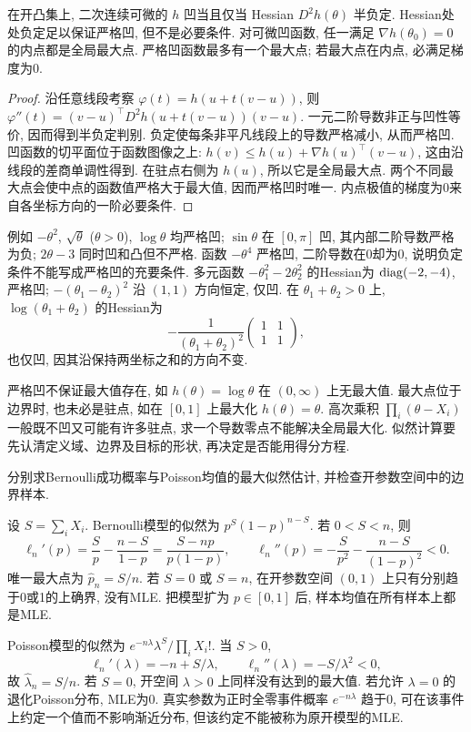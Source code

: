 \begin{proposition}[导数判别与极值]
在开凸集上, 二次连续可微的 $h$ 凹当且仅当 Hessian $D^2h(\theta)$ 半负定. Hessian处处负定足以保证严格凹, 但不是必要条件. 对可微凹函数, 任一满足 $\nabla h(\theta_0)=0$ 的内点都是全局最大点. 严格凹函数最多有一个最大点; 若最大点在内点, 必满足梯度为0.
\end{proposition}
\begin{proof}
沿任意线段考察 $\varphi(t)=h(u+t(v-u))$, 则 $\varphi''(t)=(v-u)^\top D^2h(u+t(v-u))(v-u)$. 一元二阶导数非正与凹性等价, 因而得到半负定判别. 负定使每条非平凡线段上的导数严格减小, 从而严格凹. 凹函数的切平面位于函数图像之上:
$h(v)\le h(u)+\nabla h(u)^\top(v-u)$, 这由沿线段的差商单调性得到. 在驻点右侧为 $h(u)$, 所以它是全局最大点. 两个不同最大点会使中点的函数值严格大于最大值, 因而严格凹时唯一. 内点极值的梯度为0来自各坐标方向的一阶必要条件.
\end{proof}
例如 $-\theta^2$, $\sqrt\theta$ ($\theta>0$), $\log\theta$ 均严格凹; $\sin\theta$ 在 $[0,\pi]$ 凹, 其内部二阶导数严格为负; $2\theta-3$ 同时凹和凸但不严格. 函数 $-\theta^4$ 严格凹, 二阶导数在0却为0, 说明负定条件不能写成严格凹的充要条件. 多元函数 $-\theta_1^2-2\theta_2^2$ 的Hessian为 $\operatorname{diag}(-2,-4)$, 严格凹; $-(\theta_1-\theta_2)^2$ 沿 $(1,1)$ 方向恒定, 仅凹. 在 $\theta_1+\theta_2>0$ 上, $\log(\theta_1+\theta_2)$ 的Hessian为
\[
 -\frac{1}{(\theta_1+\theta_2)^2}\begin{pmatrix}1&1\\1&1\end{pmatrix},
\]
也仅凹, 因其沿保持两坐标之和的方向不变.

严格凹不保证最大值存在, 如 $h(\theta)=\log\theta$ 在 $(0,\infty)$ 上无最大值. 最大点位于边界时, 也未必是驻点, 如在 $[0,1]$ 上最大化 $h(\theta)=\theta$. 高次乘积 $\prod_i(\theta-X_i)$ 一般既不凹又可能有许多驻点, 求一个导数零点不能解决全局最大化. 似然计算要先认清定义域、边界及目标的形状, 再决定是否能用得分方程.

\begin{example}
分别求Bernoulli成功概率与Poisson均值的最大似然估计, 并检查开参数空间中的边界样本.
\end{example}
\begin{solution}
设 $S=\sum_iX_i$. Bernoulli模型的似然为 $p^S(1-p)^{n-S}$. 若 $0<S<n$, 则
\[
 \ell_n'(p)=\frac Sp-\frac{n-S}{1-p}=\frac{S-np}{p(1-p)},\qquad
 \ell_n''(p)=-\frac S{p^2}-\frac{n-S}{(1-p)^2}<0.
\]
唯一最大点为 $\widehat p_n=S/n$. 若 $S=0$ 或 $S=n$, 在开参数空间 $(0,1)$ 上只有分别趋于0或1的上确界, 没有MLE. 把模型扩为 $p\in[0,1]$ 后, 样本均值在所有样本上都是MLE.

Poisson模型的似然为 $e^{-n\lambda}\lambda^S/\prod_iX_i!$. 当 $S>0$,
\[
 \ell_n'(\lambda)=-n+S/\lambda,\qquad
 \ell_n''(\lambda)=-S/\lambda^2<0,
\]
故 $\widehat\lambda_n=S/n$. 若 $S=0$, 开空间 $\lambda>0$ 上同样没有达到的最大值. 若允许 $\lambda=0$ 的退化Poisson分布, MLE为0. 真实参数为正时全零事件概率 $e^{-n\lambda}$ 趋于0, 可在该事件上约定一个值而不影响渐近分布, 但该约定不能被称为原开模型的MLE.
\end{solution}

